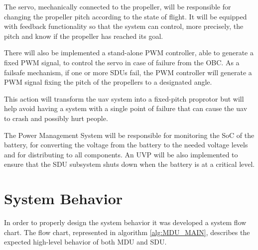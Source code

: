 The servo, mechanically connected to the propeller, will be responsible for changing the propeller pitch according to the state of flight.
It will be equipped with feedback functionality so that the system can control, more precisely, the pitch and know if the propeller has reached its goal.

There will also be implemented a stand-alone \gls{PWM} controller, able to generate a fixed \gls{PWM} signal, to control the servo in case of failure from the \gls{OBC}.
As a failsafe mechanism, if one or more SDUs fail, the \gls{PWM} controller will generate a \gls{PWM} signal fixing the pitch of the propellers to a designated angle.

This action will transform the \gls{uav} system into a fixed-pitch proprotor but will help avoid having a system with a single point of failure that can cause the \gls{uav} to crash and possibly hurt people.

The Power Management System will be responsible for monitoring the \gls{SoC} of the battery, for converting the voltage from the battery to the needed voltage levels and for distributing to all components.
An \gls{UVP} will be also implemented to ensure that the SDU subsystem shuts down when the battery is at a critical level.

\section{System Behavior}

In order to properly design the system behavior it was developed a system flow chart.
The flow chart, represented in algorithm \ref{alg:MDU_MAIN}, describes the expected high-level behavior of both MDU and SDU.
 
